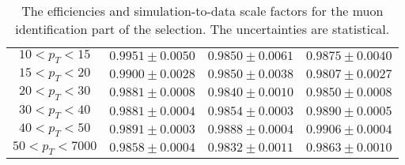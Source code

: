 \begin{table}[!ht]
\begin{center}
\begin{tabular}{c|c|c|c}
\hline 
$ 10 < p_T <  15$ & $0.9951 \pm 0.0050$ & $0.9850 \pm 0.0061$ & $0.9875 \pm 0.0040$  \\
$ 15 < p_T <  20$ & $0.9900 \pm 0.0028$ & $0.9850 \pm 0.0038$ & $0.9807 \pm 0.0027$  \\
$ 20 < p_T <  30$ & $0.9881 \pm 0.0008$ & $0.9840 \pm 0.0010$ & $0.9850 \pm 0.0008$  \\
$ 30 < p_T <  40$ & $0.9881 \pm 0.0004$ & $0.9854 \pm 0.0003$ & $0.9890 \pm 0.0005$  \\
$ 40 < p_T <  50$ & $0.9891 \pm 0.0003$ & $0.9888 \pm 0.0004$ & $0.9906 \pm 0.0004$  \\
$ 50 < p_T < 7000$ & $0.9858 \pm 0.0004$ & $0.9832 \pm 0.0011$ & $0.9863 \pm 0.0010$  \\
\hline
\end{tabular}
\caption{The efficiencies and simulation-to-data scale factors for the muon
identification part of the selection.
The uncertainties are statistical.}
\label{tab:eff_muon_id}
\end{center}
\end{table}

